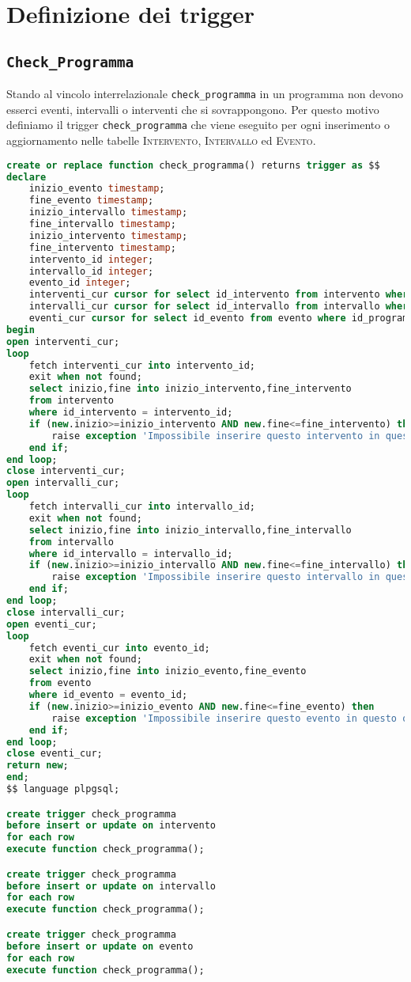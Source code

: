 \section{Definizione dei trigger}
\subsection{\texttt{Check\_Programma}}\label{vincolo:check_programma}
Stando al vincolo interrelazionale \texttt{check\_programma} in un programma non devono esserci eventi, intervalli o interventi che si sovrappongono. Per questo motivo definiamo il trigger \texttt{check\_programma} che viene eseguito per ogni inserimento o aggiornamento nelle tabelle \textsc{Intervento}, \textsc{Intervallo} ed \textsc{Evento}.
\begin{lstlisting}[language=SQL,style=mystyle,caption={check\_programma\_entry}]
create or replace function check_programma() returns trigger as $$
declare
    inizio_evento timestamp;
    fine_evento timestamp;
    inizio_intervallo timestamp;
    fine_intervallo timestamp;
    inizio_intervento timestamp;
    fine_intervento timestamp;
    intervento_id integer;
    intervallo_id integer;
    evento_id integer;
    interventi_cur cursor for select id_intervento from intervento where id_programma = new.id_programma;
    intervalli_cur cursor for select id_intervallo from intervallo where id_programma = new.id_programma;
    eventi_cur cursor for select id_evento from evento where id_programma = new.id_programma;
begin
open interventi_cur;
loop 
    fetch interventi_cur into intervento_id;
    exit when not found;
    select inizio,fine into inizio_intervento,fine_intervento
    from intervento
    where id_intervento = intervento_id;
    if (new.inizio>=inizio_intervento AND new.fine<=fine_intervento) then
        raise exception 'Impossibile inserire questo intervento in questo orario';
    end if;
end loop;
close interventi_cur;
open intervalli_cur;
loop 
    fetch intervalli_cur into intervallo_id;
    exit when not found;
    select inizio,fine into inizio_intervallo,fine_intervallo
    from intervallo
    where id_intervallo = intervallo_id;
    if (new.inizio>=inizio_intervallo AND new.fine<=fine_intervallo) then
        raise exception 'Impossibile inserire questo intervallo in questo orario';
    end if;
end loop;
close intervalli_cur;
open eventi_cur;
loop 
    fetch eventi_cur into evento_id;
    exit when not found;
    select inizio,fine into inizio_evento,fine_evento
    from evento
    where id_evento = evento_id;
    if (new.inizio>=inizio_evento AND new.fine<=fine_evento) then
        raise exception 'Impossibile inserire questo evento in questo orario';
    end if;
end loop;
close eventi_cur;
return new;
end;
$$ language plpgsql;

create trigger check_programma
before insert or update on intervento
for each row
execute function check_programma();

create trigger check_programma
before insert or update on intervallo
for each row
execute function check_programma();

create trigger check_programma
before insert or update on evento
for each row
execute function check_programma();
\end{lstlisting}

